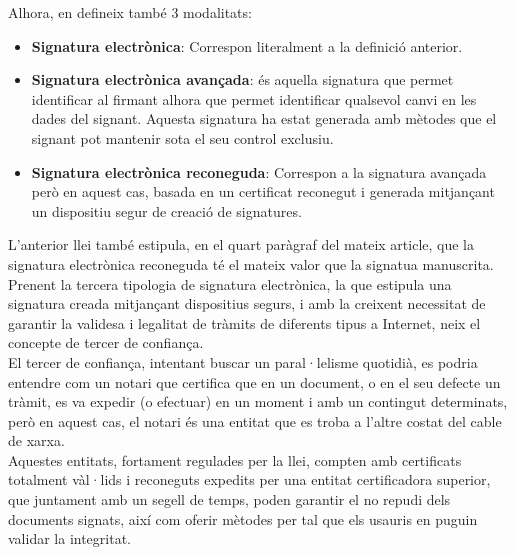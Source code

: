 Alhora, en defineix també 3 modalitats:
\begin{itemize}
	\item \textbf{Signatura electrònica}: Correspon literalment a la definició anterior.
	\item \textbf{Signatura electrònica avançada}: és aquella signatura que permet identificar al firmant alhora que permet identificar qualsevol canvi en les dades del signant. Aquesta signatura ha estat generada amb mètodes que el signant pot mantenir sota el seu control exclusiu.
	\item \textbf{Signatura electrònica reconeguda}: Correspon a la signatura avançada però en aquest cas, basada en un certificat reconegut i generada mitjançant un dispositiu segur de creació de signatures.
\end{itemize}
L'anterior llei també estipula, en el quart paràgraf del mateix article, que la signatura electrònica reconeguda té el mateix valor que la signatua manuscrita.\\
\newline Prenent la tercera tipologia de signatura electrònica, la que estipula una signatura creada mitjançant dispositius segurs, i amb la creixent necessitat de garantir la validesa i legalitat de tràmits de diferents tipus a Internet, neix el concepte de tercer de confiança.\\
\newline El tercer de confiança, intentant buscar un paral·lelisme quotidià, es podria entendre com un notari que certifica que en un document, o en el seu defecte un tràmit, es va expedir (o efectuar) en un moment i amb un contingut determinats, però en aquest cas, el notari és una entitat que es troba a l'altre costat del cable de xarxa.\\
\newline Aquestes entitats, fortament regulades per la llei, compten amb certificats totalment vàl·lids i reconeguts expedits per una entitat certificadora superior, que juntament amb un segell de temps, poden garantir el no repudi dels documents signats, així com oferir mètodes per tal que els usauris en puguin validar la integritat.

